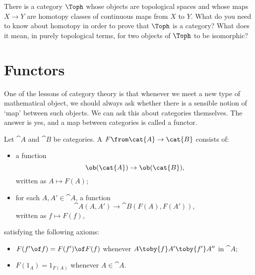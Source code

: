 \begin{question}
There is a category $\Toph$%
%
%
whose objects are topological spaces and whose
maps $X \to Y$ are homotopy%
%
%
classes of continuous maps from $X$ to $Y$.  What do you need to know about
homotopy in order to prove that $\Toph$ is a category?  What does it mean,
in purely topological terms, for two objects of $\Toph$ to be isomorphic?
\end{question}



\section{Functors}
\label{sec:ftrs}


One of the lessons of category theory is that whenever we meet a new type
of mathematical object, we should always ask whether there is a sensible
notion of `map' between such objects.  We can ask this about categories
themselves.  The answer is yes, and a map between categories is called a
functor.

\begin{defn}
Let $\cat{A}$ and $\cat{B}$ be categories.  A %
%
%
$F\from \cat{A} \to \cat{B}$ consists of:
% 
\begin{itemize}
\item 
a function
\[
\ob(\cat{A}) \to \ob(\cat{B}),
\]
written as $A \mapsto F(A)$;

\item 
for each $A, A' \in \cat{A}$, a function
\[
\cat{A}(A, A') \to \cat{B}(F(A), F(A')),
\]
written as $f \mapsto F(f)$,
\end{itemize}
% 
satisfying the following axioms:
% 
\begin{itemize}
\item 
$F(f' \of f) = F(f') \of F(f)$ whenever $A \toby{f} A' \toby{f'} A''$ in
$\cat{A}$;

\item 
$F(1_A) = 1_{F(A)}$ whenever $A \in \cat{A}$.
\end{itemize}
\end{defn}

